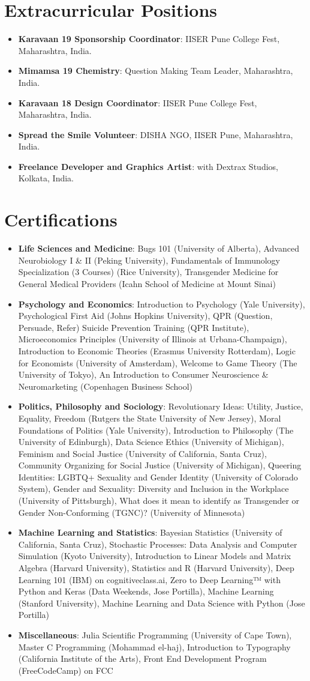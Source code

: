\documentclass[letterpaper,9pt]{article}
\newcommand{\resumeItem}[2]{
  \item\small{
    \textbf{#1}{: #2 \vspace{-2pt}}
  }
}
\newcommand{\resumeSubItem}[2]{\resumeItem{#1}{#2}\vspace{-4pt}}
\newcommand{\resumeSubHeadingListStart}{\begin{itemize}[leftmargin=*]}
\newcommand{\resumeSubHeadingListEnd}{\end{itemize}}
\begin{document}
\section{Extracurricular Positions}
\resumeSubHeadingListStart
\resumeSubItem{Karavaan 19 Sponsorship Coordinator}{IISER Pune College Fest, Maharashtra, India.}
\resumeSubItem{Mimamsa 19 Chemistry}{Question Making Team Leader, Maharashtra, India.}
\resumeSubItem{Karavaan 18 Design Coordinator}{IISER Pune College Fest, Maharashtra, India.}
\resumeSubItem{Spread the Smile Volunteer}{DISHA NGO, IISER Pune, Maharashtra, India.}
\resumeSubItem{Freelance Developer and Graphics Artist}{with Dextrax Studios, Kolkata, India.}
\resumeSubHeadingListEnd

\section{Certifications}
\resumeSubHeadingListStart
\resumeSubItem{Life Sciences and Medicine}{Bugs 101 (University of Alberta), Advanced Neurobiology I \& II (Peking University), Fundamentals of Immunology Specialization (3 Courses) (Rice University), Transgender Medicine for General Medical Providers (Icahn School of Medicine at Mount Sinai)}
\resumeSubItem{Psychology and Economics}{Introduction to Psychology (Yale University), Psychological First Aid (Johns Hopkins University), QPR (Question, Persuade, Refer) Suicide Prevention Training (QPR Institute), Microeconomics Principles (University of Illinois at Urbana-Champaign), Introduction to Economic Theories (Erasmus University Rotterdam), Logic for Economists (University of Amsterdam), Welcome to Game Theory (The University of Tokyo), An Introduction to Consumer Neuroscience \& Neuromarketing (Copenhagen Business School)}
\resumeSubItem{Politics, Philosophy and Sociology}{Revolutionary Ideas: Utility, Justice, Equality, Freedom (Rutgers the State University of New Jersey), Moral Foundations of Politics (Yale University), Introduction to Philosophy (The University of Edinburgh), Data Science Ethics (University of Michigan), Feminism and Social Justice (University of California, Santa Cruz), Community Organizing for Social Justice (University of Michigan), Queering Identities: LGBTQ+ Sexuality and Gender Identity (University of Colorado System), Gender and Sexuality: Diversity and Inclusion in the Workplace (University of Pittsburgh), What does it mean to identify as Transgender or Gender Non-Conforming (TGNC)? (University of Minnesota)}
\resumeSubItem{Machine Learning and Statistics}{Bayesian Statistics (University of California, Santa Cruz), Stochastic Processes: Data Analysis and Computer Simulation (Kyoto University), Introduction to Linear Models and Matrix Algebra (Harvard University), Statistics and R (Harvard University), Deep Learning 101 (IBM) on cognitiveclass.ai, Zero to Deep Learning™ with Python and Keras (Data Weekends, Jose Portilla), Machine Learning (Stanford University), Machine Learning and Data Science with Python (Jose Portilla)}
\resumeSubItem{Miscellaneous}{Julia Scientific Programming (University of Cape Town), Master C Programming (Mohammad el-haj), Introduction to Typography (California Institute of the Arts), Front End Development Program (FreeCodeCamp) on FCC}
\resumeSubHeadingListEnd

\end{document}
